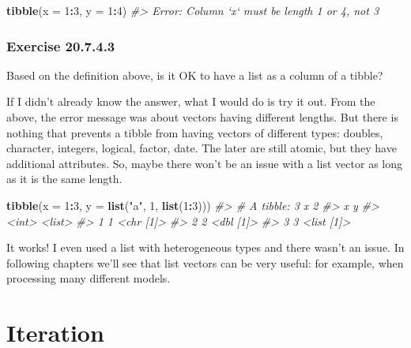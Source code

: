 \documentclass[]{book}
\newenvironment{Shaded}{\begin{snugshade}}{\end{snugshade}}
\newcommand{\CommentTok}[1]{\textcolor[rgb]{0.56,0.35,0.01}{\textit{#1}}}
\newcommand{\DataTypeTok}[1]{\textcolor[rgb]{0.13,0.29,0.53}{#1}}
\newcommand{\DecValTok}[1]{\textcolor[rgb]{0.00,0.00,0.81}{#1}}
\newcommand{\KeywordTok}[1]{\textcolor[rgb]{0.13,0.29,0.53}{\textbf{#1}}}
\newcommand{\NormalTok}[1]{#1}
\newcommand{\OperatorTok}[1]{\textcolor[rgb]{0.81,0.36,0.00}{\textbf{#1}}}
\newcommand{\StringTok}[1]{\textcolor[rgb]{0.31,0.60,0.02}{#1}}
\theoremstyle{plain}
\theoremstyle{remark}
\begin{document}
\begin{Shaded}
\begin{Highlighting}[]
\KeywordTok{tibble}\NormalTok{(}\DataTypeTok{x =} \DecValTok{1}\OperatorTok{:}\DecValTok{3}\NormalTok{, }\DataTypeTok{y =} \DecValTok{1}\OperatorTok{:}\DecValTok{4}\NormalTok{)}
\CommentTok{#> Error: Column `x` must be length 1 or 4, not 3}
\end{Highlighting}
\end{Shaded}

\hypertarget{exercise-20.7.4.3}{%
\subsection*{\texorpdfstring{Exercise {20.7.4.3}}{Exercise 20.7.4.3}}\label{exercise-20.7.4.3}}

Based on the definition above, is it OK to have a list as a column of a tibble?

If I didn't already know the answer, what I would do is try it out.
From the above, the error message was about vectors having different lengths.
But there is nothing that prevents a tibble from having vectors of different types: doubles, character, integers, logical, factor, date.
The later are still atomic, but they have additional attributes.
So, maybe there won't be an issue with a list vector as long as it is the same length.

\begin{Shaded}
\begin{Highlighting}[]
\KeywordTok{tibble}\NormalTok{(}\DataTypeTok{x =} \DecValTok{1}\OperatorTok{:}\DecValTok{3}\NormalTok{, }\DataTypeTok{y =} \KeywordTok{list}\NormalTok{(}\StringTok{"a"}\NormalTok{, }\DecValTok{1}\NormalTok{, }\KeywordTok{list}\NormalTok{(}\DecValTok{1}\OperatorTok{:}\DecValTok{3}\NormalTok{)))}
\CommentTok{#> # A tibble: 3 x 2}
\CommentTok{#>       x y         }
\CommentTok{#>   <int> <list>    }
\CommentTok{#> 1     1 <chr [1]> }
\CommentTok{#> 2     2 <dbl [1]> }
\CommentTok{#> 3     3 <list [1]>}
\end{Highlighting}
\end{Shaded}

It works! I even used a list with heterogeneous types and there wasn't an issue.
In following chapters we'll see that list vectors can be very useful: for example, when processing many different models.

\hypertarget{iteration}{%
\chapter{Iteration}\label{iteration}}
\end{document}
